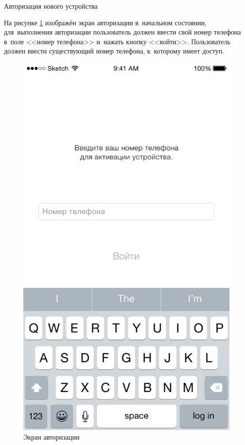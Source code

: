 \subsubsection{} Авторизация нового устройства
\label{sec:usage:auth:auth}

На рисунке \ref{sec:usage:auth:auth:login-empty} изображён экран авторизации в~начальном состоянии, для~выполнения авторизации пользователь должен ввести свой номер телефона в~поле <<номер телефона>> и~нажать кнопку <<войти>>. Пользователь должен ввести существующий номер телефона, к~которому имеет доступ.

\begin{figure}[h]
  \centering
    \includegraphics[height=0.25\textheight]{inc/img/ui/login_not_entered.png}
  \caption{Экран авторизации}
  \label{sec:usage:auth:auth:login-empty}
\end{figure}